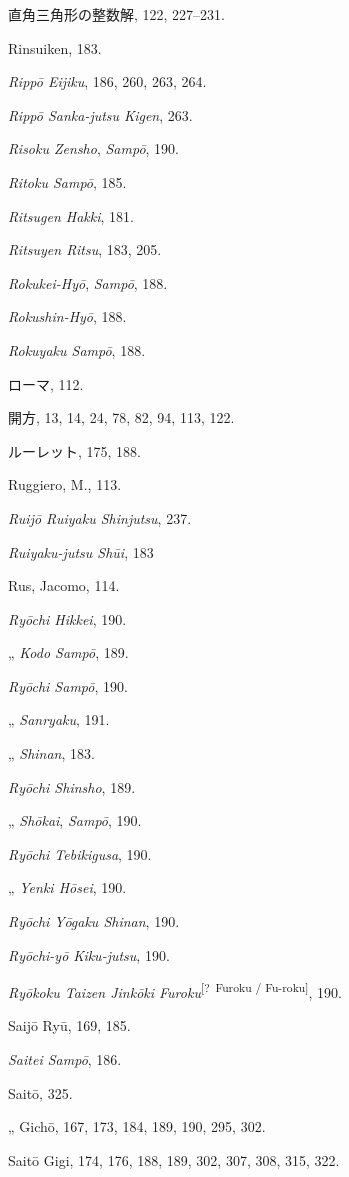 \documentclass[11pt]{article}
\newcommand{\unclear}[1]{\textsuperscript{[?~#1]}}
\begin{document}
直角三角形の整数解, 122, 227--231.\par
Rinsuiken, 183.\par
\emph{Rippō Eijiku}, 186, 260, 263, 264.\par
\emph{Rippō Sanka-jutsu Kigen}, 263.\par
\emph{Risoku Zensho}, \emph{Sampō}, 190.\par
\emph{Ritoku Sampō}, 185.\par
\emph{Ritsugen Hakki}, 181.\par
\emph{Ritsuyen Ritsu}, 183, 205.\par
\emph{Rokukei-Hyō}, \emph{Sampō}, 188.\par
\emph{Rokushin-Hyō}, 188.\par
\emph{Rokuyaku Sampō}, 188.\par
ローマ, 112.\par
開方, 13, 14, 24, 78, 82, 94, 113, 122.\par
ルーレット, 175, 188.\par
Ruggiero, M., 113.\par
\emph{Ruijō Ruiyaku Shinjutsu}, 237.\par
\emph{Ruiyaku-jutsu Shūi}, 183\par
Rus, Jacomo, 114.\par
\emph{Ryōchi Hikkei}, 190.\par
\quad „ \emph{Kodo Sampō}, 189.\par
\emph{Ryōchi Sampō}, 190.\par
\quad „ \emph{Sanryaku}, 191.\par
\quad „ \emph{Shinan}, 183.\par
\emph{Ryōchi Shinsho}, 189.\par
\quad „ \emph{Shōkai}, \emph{Sampō}, 190.\par
\emph{Ryōchi Tebikigusa}, 190.\par
\quad „ \emph{Yenki Hōsei}, 190.\par
\emph{Ryōchi Yōgaku Shinan}, 190.\par
\emph{Ryōchi-yō Kiku-jutsu}, 190.\par
\emph{Ryōkoku Taizen Jinkōki Furoku}\unclear{Furoku / Fu-roku}, 190.\par
Saijō Ryū, 169, 185.\par
\emph{Saitei Sampō}, 186.\par
Saitō, 325.\par
\quad „ Gichō, 167, 173, 184, 189, 190, 295, 302.\par
Saitō Gigi, 174, 176, 188, 189, 302, 307, 308, 315, 322.\par
\end{document}
